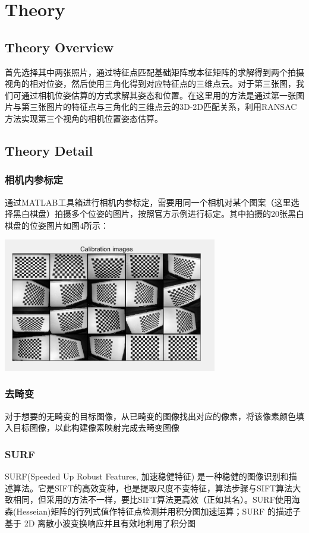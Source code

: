 \chapter{Theory}
\label{chap: Theory}

\section{Theory Overview}
首先选择其中两张照片，通过特征点匹配基础矩阵或本征矩阵的求解得到两个拍摄视角的相对位姿，然后使用三角化得到对应特征点的三维点云。对于第三张图，我们可通过相机位姿估算的方式求解其姿态和位置。在这里用的方法是通过第一张图片与第三张图片的特征点与三角化的三维点云的3D-2D匹配关系，利用RANSAC方法实现第三个视角的相机位置姿态估算。

\section{Theory Detail}
\subsection{相机内参标定}
通过MATLAB工具箱进行相机内参标定，需要用同一个相机对某个图案（这里选择黑白棋盘）拍摄多个位姿的图片，按照官方示例进行标定。其中拍摄的20张黑白棋盘的位姿图片如图4所示：

\includegraphics[width=0.7\textwidth]{figures/Picture1.png}
\subsection{去畸变}
对于想要的无畸变的目标图像，从已畸变的图像找出对应的像素，将该像素颜色填入目标图像，以此构建像素映射完成去畸变图像

\subsection{SURF}
SURF(Speeded Up Robust Features, 加速稳健特征) 是一种稳健的图像识别和描述算法。它是SIFT的高效变种，也是提取尺度不变特征，算法步骤与SIFT算法大致相同，但采用的方法不一样，要比SIFT算法更高效（正如其名）。SURF使用海森(Hesseian)矩阵的行列式值作特征点检测并用积分图加速运算；SURF 的描述子基于 2D 离散小波变换响应并且有效地利用了积分图

